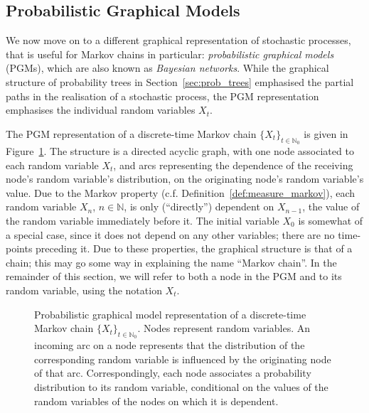 \documentclass[graybox]{svmult}
\newcommand{\nats}{\mathbb{N}}
\newcommand{\natswith}{\nats_{0}}
\begin{document}
\subsection{Probabilistic Graphical Models}\label{sec:pgm}

We now move on to a different graphical representation of stochastic processes, that is useful for Markov chains in particular: \emph{probabilistic graphical models} (PGMs), which are also known as \emph{Bayesian networks}. While the graphical structure of probability trees in Section~\ref{sec:prob_trees} emphasised the partial paths in the realisation of a stochastic process, the PGM representation emphasises the individual random variables $X_t$. 

The PGM representation of a discrete-time Markov chain $\{X_t\}_{t\in\natswith}$ is given in Figure~\ref{fig:example_markov_pgm}. The structure is a directed acyclic graph, with one node associated to each random variable $X_t$, and arcs representing the dependence of the receiving node's random variable's distribution, on the originating node's random variable's value. Due to the Markov property (c.f. Definition~\ref{def:measure_markov}), each random variable $X_n$, $n\in\nats$, is only (``directly'') dependent on $X_{n-1}$, the value of the random variable immediately before it. The initial variable $X_0$ is somewhat of a special case, since it does not depend on any other variables; there are no time-points preceding it. Due to these properties, the graphical structure is that of a chain; this may go some way in explaining the name ``Markov chain''. In the remainder of this section, we will refer to both a node in the PGM and to its random variable, using the notation $X_t$.
\begin{figure}
\centering
{}
\caption{Probabilistic graphical model representation of a discrete-time Markov chain $\{X_t\}_{t\in\natswith}$. Nodes represent random variables. An incoming arc on a node represents that the distribution of the corresponding random variable is influenced by the originating node of that arc. Correspondingly, each node associates a probability distribution to its random variable, conditional on the values of the random variables of the nodes on which it is dependent.}
\label{fig:example_markov_pgm}
\end{figure}
\end{document}
